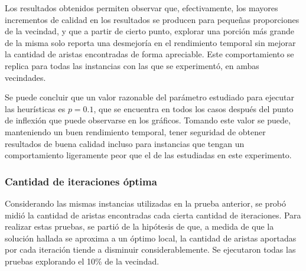 Los resultados obtenidos permiten observar que, efectivamente, los mayores
incrementos de calidad en los resultados se producen para pequeñas
proporciones de la vecindad, y que a partir de cierto punto, explorar una
porción más grande de la misma solo reporta una desmejoría en el rendimiento
temporal sin mejorar la cantidad de aristas encontradas de forma apreciable.
Este comportamiento se replica para todas las instancias con las que se
experimentó, en ambas vecindades.

Se puede concluir que un valor razonable del parámetro estudiado para ejecutar
las heurísticas es $p = 0.1$, que se encuentra en todos los casos después del
punto de inflexión que puede observarse en los gráficos. Tomando este valor se
puede, manteniendo un buen rendimiento temporal, tener seguridad de obtener
resultados de buena calidad incluso para instancias que tengan un
comportamiento ligeramente peor que el de las estudiadas en este experimento.

\subsubsection{Cantidad de iteraciones óptima}

Considerando las mismas instancias utilizadas en la prueba anterior, se probó
midió la cantidad de aristas encontradas cada cierta cantidad de iteraciones.
Para realizar estas pruebas, se partió de la hipótesis de que, a medida de
que la solución hallada se aproxima a un óptimo local, la cantidad de aristas
aportadas por cada iteración tiende a disminuir considerablemente.
Se ejecutaron todas las pruebas explorando el 10\% de la vecindad.


